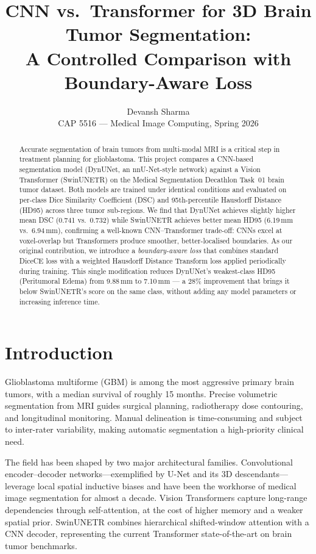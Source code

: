 \documentclass[12pt, letterpaper]{article}
\title{\textbf{CNN vs.\ Transformer for 3D Brain Tumor Segmentation:\\
       A Controlled Comparison with Boundary-Aware Loss}}
\author{Devansh Sharma\\
        CAP 5516 --- Medical Image Computing, Spring 2026}
\date{}
\begin{document}
\maketitle
\thispagestyle{empty}

\begin{abstract}
Accurate segmentation of brain tumors from multi-modal MRI is a critical step in
treatment planning for glioblastoma.
This project compares a CNN-based segmentation model (DynUNet, an nnU-Net-style
network) against a Vision Transformer (SwinUNETR) on the Medical Segmentation
Decathlon Task~01 brain tumor dataset.
Both models are trained under identical conditions and evaluated on per-class
Dice Similarity Coefficient (DSC) and 95th-percentile Hausdorff Distance (HD95)
across three tumor sub-regions.
We find that DynUNet achieves slightly higher mean DSC (0.741 vs.\ 0.732) while
SwinUNETR achieves better mean HD95 (6.19\,mm vs.\ 6.94\,mm), confirming
a well-known CNN--Transformer trade-off: CNNs excel at voxel-overlap but
Transformers produce smoother, better-localised boundaries.
As our original contribution, we introduce a \emph{boundary-aware loss}
that combines standard DiceCE loss with a weighted Hausdorff Distance
Transform loss applied periodically during training.
This single modification reduces DynUNet's weakest-class HD95
(Peritumoral Edema) from 9.88\,mm to 7.10\,mm --- a 28\% improvement that
brings it below SwinUNETR's score on the same class, without adding any
model parameters or increasing inference time.
\end{abstract}

\section{Introduction}

Glioblastoma multiforme (GBM) is among the most aggressive primary brain tumors,
with a median survival of roughly 15 months.
Precise volumetric segmentation from MRI guides surgical planning, radiotherapy
dose contouring, and longitudinal monitoring.
Manual delineation is time-consuming and subject to inter-rater variability,
making automatic segmentation a high-priority clinical need.

The field has been shaped by two major architectural families.
Convolutional encoder--decoder networks---exemplified by U-Net \cite{ronneberger2015} and
its 3D descendants---leverage local spatial inductive biases and have been
the workhorse of medical image segmentation for almost a decade.
Vision Transformers \cite{dosovitskiy2020} capture long-range dependencies
through self-attention, at the cost of higher memory and a weaker spatial prior.
SwinUNETR \cite{tang2022} combines hierarchical shifted-window attention with a
CNN decoder, representing the current Transformer state-of-the-art on brain
tumor benchmarks.
\end{document}

